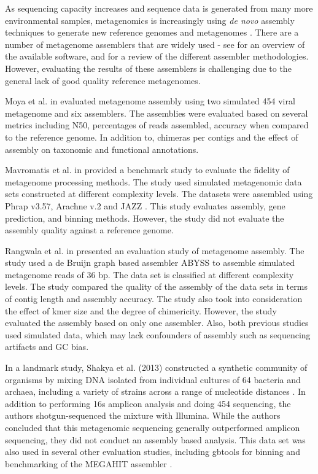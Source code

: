 \documentclass[11pt]{article}
\begin{document}
As sequencing capacity increases and sequence data is generated from
many more environmental samples, metagenomics is increasingly using
{\em de novo} assembly techniques to generate new reference genomes
and metagenomes \cite{Sharon2012}.  There are a number of metagenome
assemblers that are widely used - see \cite{Vollmers2017} for an
overview of the available software, and \cite{ghurye2016metagenomic}
for a review of the different assembler methodologies. However,
evaluating the results of these assemblers is challenging due to the
general lack of good quality reference metagenomes.


Moya et al. in \cite{moya2014} evaluated metagenome assembly using
two simulated 454 viral metagenome and six assemblers. The assemblies
were evaluated based on several metrics including N50, percentages of
reads assembled, accuracy when compared to the reference genome. In
addition to, chimeras per contigs and the effect of assembly on
taxonomic and functional annotations.
 
Mavromatis et al. in \cite{mavromatis2007} provided a benchmark study
to evaluate the fidelity of metagenome processing methods. The study used
simulated metagenomic data sets constructed at different complexity
levels.
The datasets were assembled using Phrap v3.57, Arachne v.2
\cite{arachne} and JAZZ \cite{jazz}.
This study evaluates assembly, gene prediction, and binning
methods. However, the study did not evaluate the assembly quality
against a reference genome.

Rangwala et al. in \cite{huzefa2011} presented an evaluation study of
metagenome assembly. The study used a de Bruijn graph based assembler
ABYSS \cite{abyss} to assemble simulated metagenome reads of 36 bp. The
data set is classified at different complexity levels.  The study
compared the quality of the assembly of the data sets in terms of
contig length and assembly accuracy. The study also took into
consideration the effect of kmer size and the degree of chimericity.
However, the study evaluated the assembly based on only one
assembler. Also, both previous studies used simulated data, which may
lack confounders of assembly such as sequencing artifacts and GC bias.

In a landmark study, Shakya et al. (2013) constructed a synthetic
community of organisms by mixing DNA isolated from individual cultures
of 64 bacteria and archaea, including a variety of strains across a
range of nucleotide distances \cite{podar}.  In addition to performing
16s amplicon analysis and doing 454 sequencing, the authors
shotgun-sequenced the mixture with Illumina.  While the authors
concluded that this metagenomic sequencing generally outperformed
amplicon sequencing, they did not conduct an assembly based analysis.
This data set was also used in several other evaluation studies,
including gbtools for binning \cite{Seah2015} and benchmarking of the
MEGAHIT assembler \cite{Li2016}.
\end{document}
